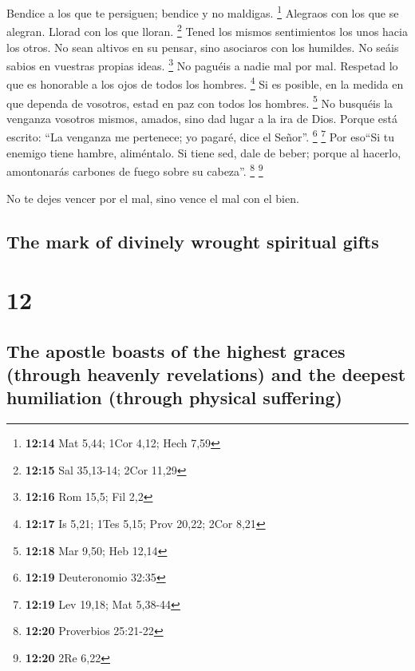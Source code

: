 \begin{paracol}{2}
 Bendice a los que te persiguen; bendice y no maldigas.
\footnote{\textbf{12:14} Mat 5,44; 1Cor 4,12; Hech 7,59} 
Alegraos con los que se alegran. Llorad con los que lloran. \footnote{\textbf{12:15}
  Sal 35,13-14; 2Cor 11,29}  Tened los mismos
sentimientos los unos hacia los otros. No sean altivos en su pensar,
sino asociaros con los humildes. No seáis sabios en vuestras propias
ideas. \footnote{\textbf{12:16} Rom 15,5; Fil 2,2}  No
paguéis a nadie mal por mal. Respetad lo que es honorable a los ojos de
todos los hombres. \footnote{\textbf{12:17} Is 5,21; 1Tes 5,15; Prov
  20,22; 2Cor 8,21}  Si es posible, en la medida en que
dependa de vosotros, estad en paz con todos los hombres. \footnote{\textbf{12:18}
  Mar 9,50; Heb 12,14}  No busquéis la venganza vosotros
mismos, amados, sino dad lugar a la ira de Dios. Porque está escrito:
``La venganza me pertenece; yo pagaré, dice el Señor''. \footnote{\textbf{12:19}
  Deuteronomio 32:35} \footnote{\textbf{12:19} Lev 19,18; Mat 5,38-44}
 Por eso``Si tu enemigo tiene hambre, aliméntalo. Si
tiene sed, dale de beber; porque al hacerlo, amontonarás carbones de
fuego sobre su cabeza''. \footnote{\textbf{12:20} Proverbios 25:21-22}
\footnote{\textbf{12:20} 2Re 6,22}

 No te dejes vencer por el mal, sino vence el mal con el
bien.

\switchcolumn
\begin{otherlanguage}{english}

\hypertarget{the-mark-of-divinely-wrought-spiritual-gifts}{%
\subsection{The mark of divinely wrought spiritual
gifts}\label{the-mark-of-divinely-wrought-spiritual-gifts}}

\hypertarget{section-23}{%
\section{12}\label{section-23}}

\hypertarget{the-apostle-boasts-of-the-highest-graces-through-heavenly-revelations-and-the-deepest-humiliation-through-physical-suffering}{%
\subsection{The apostle boasts of the highest graces (through heavenly
revelations) and the deepest humiliation (through physical
suffering)}\label{the-apostle-boasts-of-the-highest-graces-through-heavenly-revelations-and-the-deepest-humiliation-through-physical-suffering}}


\end{otherlanguage}
\end{paracol}
